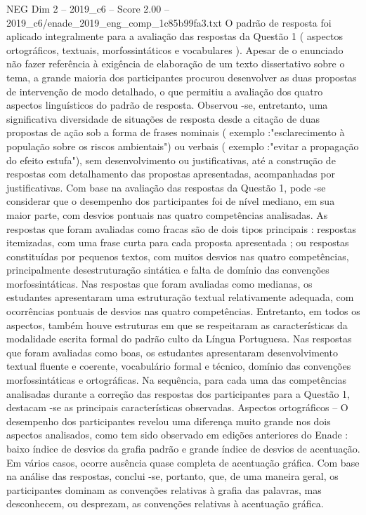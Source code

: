 \begin{textsample}{NEG Dim 2 – 2019\_c6 – Score 2.00 – 2019\_c6/enade\_2019\_eng\_comp\_1c85b99fa3.txt}
O padrão de resposta foi aplicado integralmente para a avaliação das respostas da Questão 1 ( aspectos ortográficos, textuais, morfossintáticos e vocabulares ).
Apesar de o enunciado não fazer referência à exigência de elaboração de um texto dissertativo sobre o tema, a grande maioria dos participantes procurou desenvolver as duas propostas de intervenção de modo detalhado, o que permitiu a avaliação dos quatro aspectos linguísticos do padrão de resposta.
Observou -se, entretanto, uma significativa diversidade de situações de resposta desde a citação de duas propostas de ação sob a forma de frases nominais ( exemplo :"esclarecimento à população sobre os riscos ambientais") ou verbais ( exemplo :"evitar a propagação do efeito estufa"), sem desenvolvimento ou justificativas, até a construção de respostas com detalhamento das propostas apresentadas, acompanhadas por justificativas.
Com base na avaliação das respostas da Questão 1, pode -se considerar que o desempenho dos participantes foi de nível mediano, em sua maior parte, com desvios pontuais nas quatro competências analisadas.
As respostas que foram avaliadas como fracas são de dois tipos principais : respostas itemizadas, com uma frase curta para cada proposta apresentada ; ou respostas constituídas por pequenos textos, com muitos desvios nas quatro competências, principalmente desestruturação sintática e falta de domínio das convenções morfossintáticas.
Nas respostas que foram avaliadas como medianas, os estudantes apresentaram uma estruturação textual relativamente adequada, com ocorrências pontuais de desvios nas quatro competências.
Entretanto, em todos os aspectos, também houve estruturas em que se respeitaram as características da modalidade escrita formal do padrão culto da Língua Portuguesa.
Nas respostas que foram avaliadas como boas, os estudantes apresentaram desenvolvimento textual fluente e coerente, vocabulário formal e técnico, domínio das convenções morfossintáticas e ortográficas.
Na sequência, para cada uma das competências analisadas durante a correção das respostas dos participantes para a Questão 1, destacam -se as principais características observadas.
Aspectos ortográficos – O desempenho dos participantes revelou uma diferença muito grande nos dois aspectos analisados, como tem sido observado em edições anteriores do Enade : baixo índice de desvios da grafia padrão e grande índice de desvios de acentuação.
Em vários casos, ocorre ausência quase completa de acentuação gráfica.
Com base na análise das respostas, conclui -se, portanto, que, de uma maneira geral, os participantes dominam as convenções relativas à grafia das palavras, mas desconhecem, ou desprezam, as convenções relativas à acentuação gráfica.

\end{textsample}
